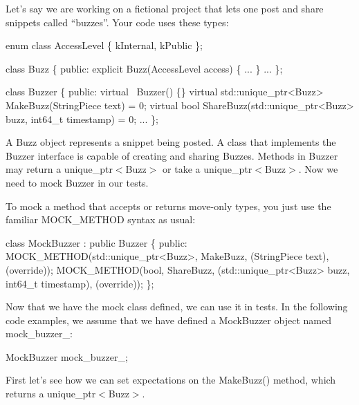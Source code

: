Let’s say we are working on a fictional project that lets one post and share snippets called “buzzes”. Your code uses these types\+:


\begin{DoxyCode}
\textcolor{keyword}{enum class} AccessLevel \{ kInternal, kPublic \};

\textcolor{keyword}{class }Buzz \{
 \textcolor{keyword}{public}:
  \textcolor{keyword}{explicit} Buzz(AccessLevel access) \{ ... \}
  ...
\};

\textcolor{keyword}{class }Buzzer \{
 \textcolor{keyword}{public}:
  \textcolor{keyword}{virtual} ~Buzzer() \{\}
  \textcolor{keyword}{virtual} std::unique\_ptr<Buzz> MakeBuzz(StringPiece text) = 0;
  \textcolor{keyword}{virtual} \textcolor{keywordtype}{bool} ShareBuzz(std::unique\_ptr<Buzz> buzz, int64\_t timestamp) = 0;
  ...
\};
\end{DoxyCode}


A {\ttfamily Buzz} object represents a snippet being posted. A class that implements the {\ttfamily Buzzer} interface is capable of creating and sharing {\ttfamily Buzz}es. Methods in {\ttfamily Buzzer} may return a {\ttfamily unique\+\_\+ptr$<$Buzz$>$} or take a {\ttfamily unique\+\_\+ptr$<$Buzz$>$}. Now we need to mock {\ttfamily Buzzer} in our tests.

To mock a method that accepts or returns move-\/only types, you just use the familiar {\ttfamily M\+O\+C\+K\+\_\+\+M\+E\+T\+H\+OD} syntax as usual\+:


\begin{DoxyCode}
\textcolor{keyword}{class }MockBuzzer : \textcolor{keyword}{public} Buzzer \{
 \textcolor{keyword}{public}:
  MOCK\_METHOD(std::unique\_ptr<Buzz>, MakeBuzz, (StringPiece text), (\textcolor{keyword}{override}));
  MOCK\_METHOD(\textcolor{keywordtype}{bool}, ShareBuzz, (std::unique\_ptr<Buzz> buzz, int64\_t timestamp),
              (\textcolor{keyword}{override}));
\};
\end{DoxyCode}


Now that we have the mock class defined, we can use it in tests. In the following code examples, we assume that we have defined a {\ttfamily Mock\+Buzzer} object named {\ttfamily mock\+\_\+buzzer\+\_\+}\+:


\begin{DoxyCode}
MockBuzzer mock\_buzzer\_;
\end{DoxyCode}


First let’s see how we can set expectations on the {\ttfamily Make\+Buzz()} method, which returns a {\ttfamily unique\+\_\+ptr$<$Buzz$>$}.


